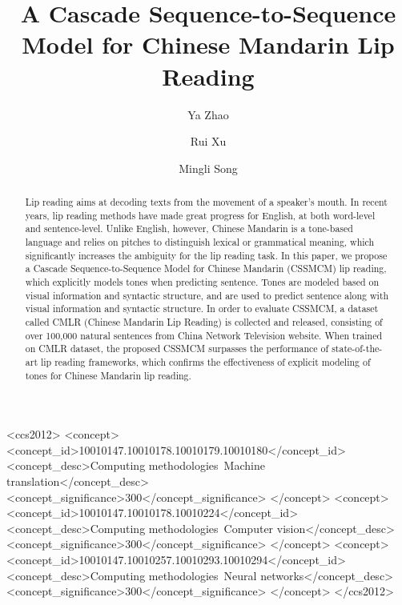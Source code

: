 \documentclass[sigconf]{acmart}
\begin{document}
\title{A Cascade Sequence-to-Sequence Model for Chinese Mandarin Lip Reading}

\author{Ya Zhao}

\author{Rui Xu}

\author{Mingli Song}


\begin{abstract}
Lip reading aims at decoding texts from the movement of a speaker's mouth. In recent years, lip reading methods have made great progress for English, at both word-level and sentence-level. Unlike English, however, Chinese Mandarin is a tone-based language and relies on pitches to distinguish lexical or grammatical meaning, which significantly increases the ambiguity for the lip reading task. In this paper, we propose a Cascade Sequence-to-Sequence Model for Chinese Mandarin (CSSMCM) lip reading, which explicitly models tones when predicting sentence. Tones are modeled based on visual information and syntactic structure, and are used to predict sentence along with visual information and syntactic structure. In order to evaluate CSSMCM, a dataset called CMLR (Chinese Mandarin Lip Reading) is collected and released, consisting of over 100,000 natural sentences from China Network Television website. When trained on CMLR dataset, the proposed CSSMCM surpasses the performance of state-of-the-art lip reading frameworks, which confirms the effectiveness of explicit modeling of tones for Chinese Mandarin lip reading.
\end{abstract}

\begin{CCSXML}
<ccs2012>
    <concept>
        <concept_id>10010147.10010178.10010179.10010180</concept_id>
        <concept_desc>Computing methodologies~Machine translation</concept_desc>
        <concept_significance>300</concept_significance>
    </concept>
    <concept>
        <concept_id>10010147.10010178.10010224</concept_id>
        <concept_desc>Computing methodologies~Computer vision</concept_desc>
        <concept_significance>300</concept_significance>
    </concept>
    <concept>
        <concept_id>10010147.10010257.10010293.10010294</concept_id>
        <concept_desc>Computing methodologies~Neural networks</concept_desc>
        <concept_significance>300</concept_significance>
    </concept>
</ccs2012>
\end{CCSXML}
\end{document}
